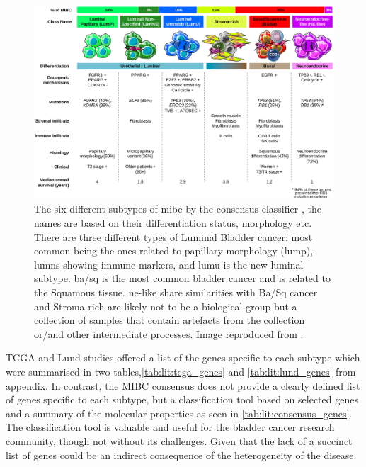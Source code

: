 \begin{figure}[!t]   
\centering
\includegraphics[width=1.0\textwidth,height=1.0\textheight,keepaspectratio]{Sections/Lit_review/Resources/2020_consensus_subtypes.jpg}
  \caption[Summary of the MIBC consensus subgroups]{The six different subtypes of \acrfull{mibc} by the consensus classifier \citep{Kamoun2020-tj}, the names are based on their differentiation status, morphology etc. There are three different types of Luminal Bladder cancer: most common being the ones related to papillary morphology (\acrfull{lump}), \acrfull{lumns} showing immune markers, and \acrfull{lumu} is the new luminal subtype. \acrfull{ba/sq} is the most common bladder cancer and is related to the Squamous tissue. \acrfull{ne-like} share similarities with Ba/Sq cancer and Stroma-rich are likely not to be a biological group but a collection of samples that contain artefacts from the collection or/and other intermediate processes. Image reproduced from \citep{Kamoun2020-tj}.
}
\label{fig:lit:2020_consens}
\end{figure}
\FloatBarrier


TCGA and Lund studies offered a list of the genes specific to each subtype which were summarised in two tables,\cref{tab:lit:tcga_genes} and \cref{tab:lit:lund_genes} from appendix. In contrast, the MIBC consensus does not provide a clearly defined list of genes specific to each subtype, but a classification tool based on selected genes and a summary of the molecular properties as seen in \cref{tab:lit:consensus_genes}. The classification tool is valuable and useful for the bladder cancer research community, though not without its challenges. Given that the lack of a succinct list of genes could be an indirect consequence of the heterogeneity of the disease.


